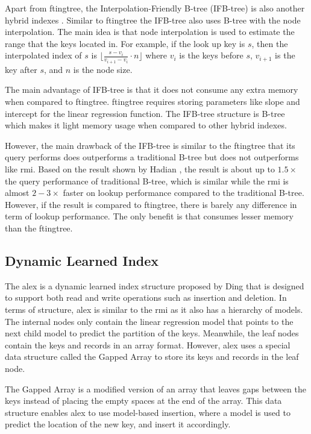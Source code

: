 Apart from \acrshort{ftingtree}, the \textsf{Interpolation-Friendly B-tree} (IFB-tree) is also another hybrid indexes \cite{ifb-tree}. Similar to \acrshort{ftingtree} the IFB-tree also uses B-tree with the node interpolation. The main idea is that node  interpolation is used to estimate the range that the keys located in. For example, if the look up key is $s$, then the interpolated index of $s$ is $\lfloor \frac{s-v_i}{v_{i+1} - v_i} \cdot n \rfloor$ where $v_i$ is the keys before $s$, $v_{i+1}$ is the key after $s$, and $n$ is the node size.

The main advantage of IFB-tree is that it does not consume any extra memory when compared to \acrshort{ftingtree}. \acrshort{ftingtree} requires storing parameters like slope and intercept for the linear regression function. The IFB-tree structure is B-tree which makes it light memory usage when compared to other hybrid indexes. 

However, the main drawback of the IFB-tree is similar to the \acrshort{ftingtree} that its query performs does outperforms a traditional B-tree but does not outperforms \learnindex like \acrshort{rmi}. Based on the result shown by Hadian \cite{ifb-tree}, the result is about up to $1.5\times$ the query performance of traditional B-tree, which is similar while the \acrshort{rmi} is almost $2-3\times$ faster on lookup performance compared to the traditional B-tree. However, if the result is compared to \acrshort{ftingtree}, there is barely any difference in term of lookup performance. The only benefit is that consumes lesser memory than the \acrshort{ftingtree}. 
 
\subsection{Dynamic Learned Index}
The \acrfull{alex} is a dynamic learned index structure proposed by Ding \cite{ALEX} that is designed to support both read and write operations such as insertion and deletion. In terms of structure, \acrshort{alex} is similar to the \acrshort{rmi} as it also has a hierarchy of models. The internal nodes only contain the linear regression model that points to the next child model to predict the partition of the keys. Meanwhile, the leaf nodes contain the keys and records in an array format. However, \acrshort{alex} uses a special data structure called the \textsf{Gapped Array} to store its keys and records in the leaf node.

The \textsf{Gapped Array} is a modified version of an array that leaves gaps between the keys instead of placing the empty spaces at the end of the array. This data structure enables \acrshort{alex} to use model-based insertion, where a model is used to predict the location of the new key, and insert it accordingly.

